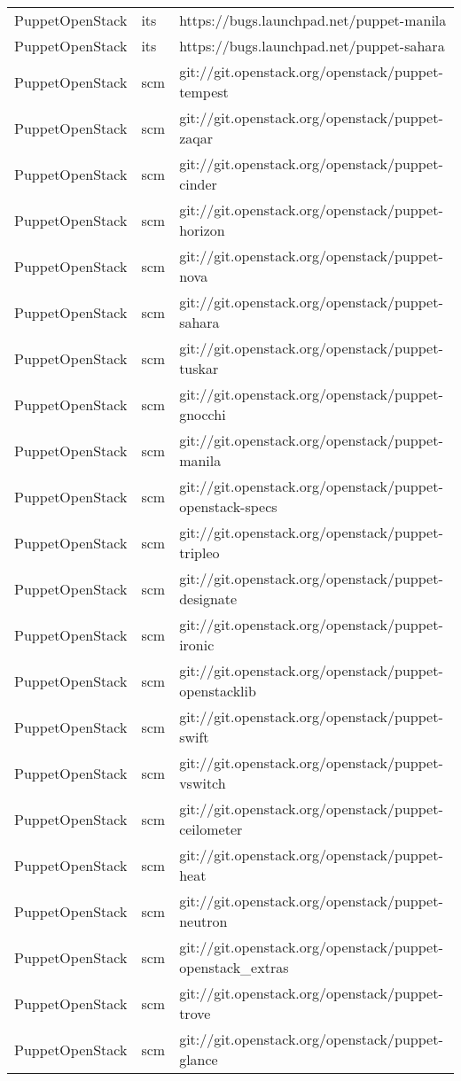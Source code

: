 \begin{center}
\begin{longtable}{|p{4cm}|p{1cm}|p{10cm}|}
PuppetOpenStack&its&https://bugs.launchpad.net/puppet-manila\\ 
PuppetOpenStack&its&https://bugs.launchpad.net/puppet-sahara\\ 
PuppetOpenStack&scm&git://git.openstack.org/openstack/puppet-tempest\\ 
PuppetOpenStack&scm&git://git.openstack.org/openstack/puppet-zaqar\\ 
PuppetOpenStack&scm&git://git.openstack.org/openstack/puppet-cinder\\ 
PuppetOpenStack&scm&git://git.openstack.org/openstack/puppet-horizon\\ 
PuppetOpenStack&scm&git://git.openstack.org/openstack/puppet-nova\\ 
PuppetOpenStack&scm&git://git.openstack.org/openstack/puppet-sahara\\ 
PuppetOpenStack&scm&git://git.openstack.org/openstack/puppet-tuskar\\ 
PuppetOpenStack&scm&git://git.openstack.org/openstack/puppet-gnocchi\\ 
PuppetOpenStack&scm&git://git.openstack.org/openstack/puppet-manila\\ 
PuppetOpenStack&scm&git://git.openstack.org/openstack/puppet-openstack-specs\\ 
PuppetOpenStack&scm&git://git.openstack.org/openstack/puppet-tripleo\\ 
PuppetOpenStack&scm&git://git.openstack.org/openstack/puppet-designate\\ 
PuppetOpenStack&scm&git://git.openstack.org/openstack/puppet-ironic\\ 
PuppetOpenStack&scm&git://git.openstack.org/openstack/puppet-openstacklib\\ 
PuppetOpenStack&scm&git://git.openstack.org/openstack/puppet-swift\\ 
PuppetOpenStack&scm&git://git.openstack.org/openstack/puppet-vswitch\\ 
PuppetOpenStack&scm&git://git.openstack.org/openstack/puppet-ceilometer\\ 
PuppetOpenStack&scm&git://git.openstack.org/openstack/puppet-heat\\ 
PuppetOpenStack&scm&git://git.openstack.org/openstack/puppet-neutron\\ 
PuppetOpenStack&scm&git://git.openstack.org/openstack/puppet-openstack\_extras\\ 
PuppetOpenStack&scm&git://git.openstack.org/openstack/puppet-trove\\ 
PuppetOpenStack&scm&git://git.openstack.org/openstack/puppet-glance\\ 

\end{longtable}
\end{center}
